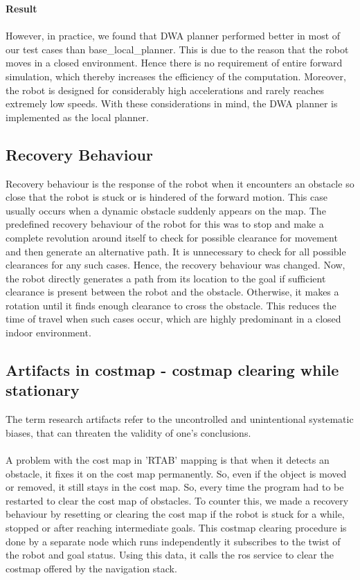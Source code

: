 \documentclass[12pt]{article}
\begin{document}
\textbf{Result}\\ \\
However, in practice, we found that DWA planner performed better in most of our test cases than base\_local\_planner. This is due to the reason that the robot moves in a closed environment. Hence there is no requirement of entire forward simulation, which thereby increases the efficiency of the computation. Moreover, the robot is designed for considerably high accelerations and rarely reaches extremely low speeds. With these considerations in mind, the DWA planner is implemented as the local planner.

\subsection{Recovery Behaviour}
Recovery behaviour is the response of the robot when it encounters an obstacle so close that the robot is stuck or is hindered of the forward motion. This case usually occurs when a dynamic obstacle suddenly appears on the map. The predefined recovery behaviour of the robot for this was to stop and make a complete revolution around itself to check for possible clearance for movement and then generate an alternative path. It is unnecessary to check for all possible clearances for any such cases. Hence, the recovery behaviour was changed. Now, the robot directly generates a path from its location to the goal if sufficient clearance is present between the robot and the obstacle. Otherwise, it makes a rotation until it finds enough clearance to cross the obstacle. This reduces the time of travel when such cases occur, which are highly predominant in a closed indoor environment.

\subsection{Artifacts in costmap - costmap clearing while stationary}
The term research artifacts refer to the uncontrolled and unintentional systematic biases, that can threaten the validity of one's conclusions. \\ \\
A problem with the cost map in 'RTAB' mapping is that when it detects an obstacle, it fixes it on the cost map permanently. So, even if the object is moved or removed, it still stays in the cost map. So, every time the program had to be restarted to clear the cost map of obstacles. To counter this, we made a recovery behaviour by resetting or clearing the cost map if the robot is stuck for a while, stopped or after reaching intermediate goals. This costmap clearing procedure is done by a separate node which runs independently it subscribes to the twist of the robot and goal status. Using this data, it calls the ros service to clear the costmap offered by the navigation stack.
\end{document}
